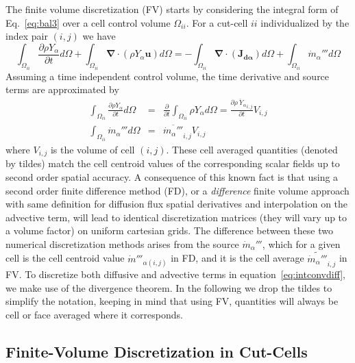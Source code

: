 The finite volume discretization (FV) starts by considering the integral form of Eq.~\eqref{eq:bal3} over a cell control volume $\Omega_{ii}$. For a cut-cell
$ii$ individualized by the index pair $(i,j)$ we have
%
\begin{equation}
 \int_{\Omega_{ii}} {\frac{\partial \rho Y_\alpha}{\partial t}} d \Omega + \int_{\Omega_{ii}} { \boldsymbol{\nabla} \cdot  \left(  \rho Y_\alpha \mathbf{u} \right)
      } d \Omega  = -\int_{\Omega_{ii}} { \boldsymbol{\nabla} \cdot \left(  \mathbf{J_{d \alpha}}  \right)  } d \Omega + \int_{\Omega_{ii}} { \dot{m}_\alpha''' } d \Omega \label{eq:intconvdiff}
\end{equation}
%
Assuming a time independent control volume, the time derivative and source terms are approximated by
%
\begin{eqnarray}
  \int_{\Omega_{ii}} {\frac{\partial \rho Y_\alpha}{\partial t}} d \Omega & = & \frac{\partial}{\partial t} \int_{\Omega_{ii}} {\rho Y_\alpha} d \Omega
  = \frac{\partial \overline{\rho \: Y_\alpha }_{i,j}}{\partial t} V_{i,j} \\
  \int_{\Omega_{ii}} { \dot{m}_\alpha''' } d \Omega & = & \overline{ \dot{m}_\alpha''' }_{i,j} V_{i,j} \label{eq:intcons}
\end{eqnarray}
%
where $V_{i,j}$ is the volume of cell $(i,j)$. These cell averaged quantities (denoted by tildes) match the cell centroid values of the corresponding scalar fields up to second order spatial accuracy. A consequence of this known fact is that using a second order finite difference method (FD), or a \textit{difference} finite volume approach with same definition
 for diffusion flux spatial derivatives and interpolation on the advective term, will lead to identical discretization matrices (they will vary up to a volume factor) on uniform cartesian grids. The difference between these two numerical discretization methods arises from the source $\dot{m}_\alpha''' $, which for a given cell is the cell centroid value $\dot{m}'''_{\alpha (i,j)}$ in FD, and it is the cell average $ \widetilde{ \dot{m}_\alpha''' }_{i,j}$ in FV. To discretize both diffusive and advective terms in equation~\eqref{eq:intconvdiff}, we make use of the divergence theorem. In the following we drop the tildes to simplify the notation, keeping in mind that using FV, quantities will always be cell or face averaged where it corresponds.


\subsection{Finite-Volume Discretization in Cut-Cells} \label{sec:cc}

